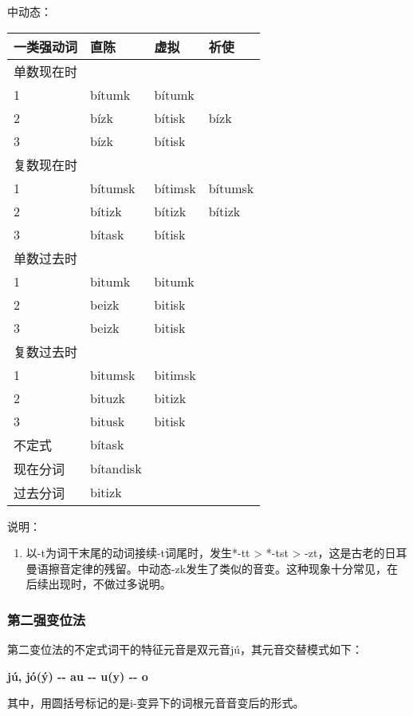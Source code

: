 中动态：

\begin{longtable}{llll}
\toprule
一类强动词 & 直陈 & 虚拟 & 祈使 \\
\midrule
\endhead
\bottomrule
\endfoot
单数现在时 & & & \\
1 & bítumk & bítumk & \\
2 & bízk & bítisk & bízk \\
3 & bízk & bítisk & \\
复数现在时 & & & \\
1 & bítumsk & bítimsk & bítumsk \\
2 & bítizk & bítizk & bítizk \\
3 & bítask & bítisk & \\
单数过去时 & & & \\
1 & bitumk & bitumk & \\
2 & beizk & bitisk & \\
3 & beizk & bitisk & \\
复数过去时 & & & \\
1 & bitumsk & bitimsk & \\
2 & bituzk & bitizk & \\
3 & bitusk & bitisk & \\
不定式 & bítask & & \\
现在分词 & bítandisk & & \\
过去分词 & bitizk & & \\
\end{longtable}

说明：

\begin{enumerate}
\def\labelenumi{\arabic{enumi})}
\item
  以-t为词干末尾的动词接续-t词尾时，发生*-tt \textgreater{} *-tst
  \textgreater{}
  -zt，这是古老的日耳曼语擦音定律的残留。中动态-zk发生了类似的音变。这种现象十分常见，在后续出现时，不做过多说明。
\end{enumerate}

\subsubsection{第二强变位法}\label{ux7b2cux4e8cux5f3aux53d8ux4f4dux6cd5}

第二变位法的不定式词干的特征元音是双元音jú，其元音交替模式如下：

\textbf{jú, jó(ý) -\/- au -\/- u(y) -\/- o}

其中，用圆括号标记的是i-变异下的词根元音音变后的形式。

